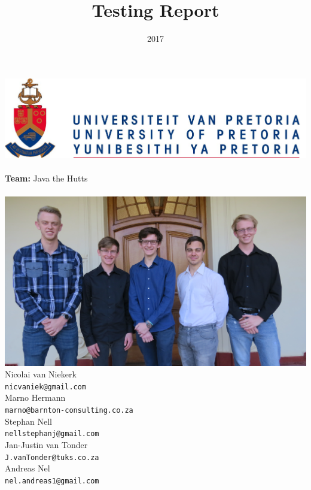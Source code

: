 \documentclass{article}
\title{Testing Report}
\date{2017}
\begin{document}
\makeatletter
    \begin{titlepage}
        \begin{center}
            \includegraphics[width=0.7\linewidth]{img/up.png}\\[4ex]
            {\huge \bfseries \@title }\\[2ex]
            {\LARGE \textbf{Team:} Java the Hutts}\\[2ex]
            {\LARGE \@date}\\[2ex]
            {\includegraphics[width=\linewidth]{img/team_photo.jpg}}\\[2ex]
            {\large  Nicolai van Niekerk\\ \texttt{nicvaniek@gmail.com}}\\[2ex]
            {\large  Marno Hermann\\ \texttt{marno@barnton-consulting.co.za}}\\[2ex]
            {\large  Stephan Nell\\ \texttt{nellstephanj@gmail.com}}\\[2ex]
            {\large  Jan-Justin van Tonder\\ \texttt{J.vanTonder@tuks.co.za}}\\[2ex]
            {\large  Andreas Nel\\ \texttt{nel.andreas1@gmail.com}}\\[2ex]
        \end{center}
        
    \end{titlepage}
\makeatother
\end{document}
